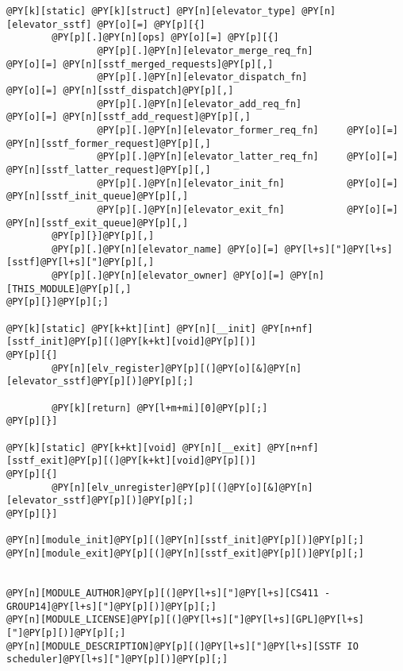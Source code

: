 \begin{Verbatim}[commandchars=@\[\]]
@PY[k][static] @PY[k][struct] @PY[n][elevator_type] @PY[n][elevator_sstf] @PY[o][=] @PY[p][{]
        @PY[p][.]@PY[n][ops] @PY[o][=] @PY[p][{]
                @PY[p][.]@PY[n][elevator_merge_req_fn]                @PY[o][=] @PY[n][sstf_merged_requests]@PY[p][,]
                @PY[p][.]@PY[n][elevator_dispatch_fn]                @PY[o][=] @PY[n][sstf_dispatch]@PY[p][,]
                @PY[p][.]@PY[n][elevator_add_req_fn]                @PY[o][=] @PY[n][sstf_add_request]@PY[p][,]
                @PY[p][.]@PY[n][elevator_former_req_fn]     @PY[o][=] @PY[n][sstf_former_request]@PY[p][,]
                @PY[p][.]@PY[n][elevator_latter_req_fn]     @PY[o][=] @PY[n][sstf_latter_request]@PY[p][,]
                @PY[p][.]@PY[n][elevator_init_fn]           @PY[o][=] @PY[n][sstf_init_queue]@PY[p][,]
                @PY[p][.]@PY[n][elevator_exit_fn]           @PY[o][=] @PY[n][sstf_exit_queue]@PY[p][,]
        @PY[p][}]@PY[p][,]
        @PY[p][.]@PY[n][elevator_name] @PY[o][=] @PY[l+s]["]@PY[l+s][sstf]@PY[l+s]["]@PY[p][,]
        @PY[p][.]@PY[n][elevator_owner] @PY[o][=] @PY[n][THIS_MODULE]@PY[p][,]
@PY[p][}]@PY[p][;]

@PY[k][static] @PY[k+kt][int] @PY[n][__init] @PY[n+nf][sstf_init]@PY[p][(]@PY[k+kt][void]@PY[p][)]
@PY[p][{]
        @PY[n][elv_register]@PY[p][(]@PY[o][&]@PY[n][elevator_sstf]@PY[p][)]@PY[p][;]

        @PY[k][return] @PY[l+m+mi][0]@PY[p][;]
@PY[p][}]

@PY[k][static] @PY[k+kt][void] @PY[n][__exit] @PY[n+nf][sstf_exit]@PY[p][(]@PY[k+kt][void]@PY[p][)]
@PY[p][{]
        @PY[n][elv_unregister]@PY[p][(]@PY[o][&]@PY[n][elevator_sstf]@PY[p][)]@PY[p][;]
@PY[p][}]

@PY[n][module_init]@PY[p][(]@PY[n][sstf_init]@PY[p][)]@PY[p][;]
@PY[n][module_exit]@PY[p][(]@PY[n][sstf_exit]@PY[p][)]@PY[p][;]


@PY[n][MODULE_AUTHOR]@PY[p][(]@PY[l+s]["]@PY[l+s][CS411 - GROUP14]@PY[l+s]["]@PY[p][)]@PY[p][;]
@PY[n][MODULE_LICENSE]@PY[p][(]@PY[l+s]["]@PY[l+s][GPL]@PY[l+s]["]@PY[p][)]@PY[p][;]
@PY[n][MODULE_DESCRIPTION]@PY[p][(]@PY[l+s]["]@PY[l+s][SSTF IO scheduler]@PY[l+s]["]@PY[p][)]@PY[p][;]
\end{Verbatim}
